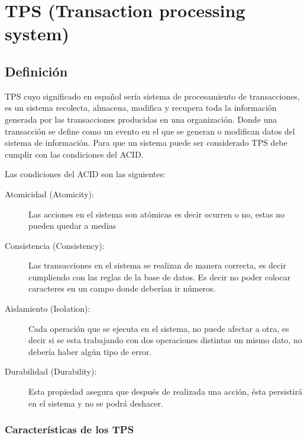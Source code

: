 \chapter[TPS]{TPS (Transaction processing system)}


\section {Definición}
TPS cuyo significado en español sería sistema de procesamiento de transacciones, es un sistema recolecta, almacena, modifica y recupera toda la información generada por las transacciones producidas en una organización.
Donde una transacción se define como un evento en el que se generan o modifican datos del sistema de información. Para que un sistema puede ser considerado TPS debe cumplir con las condiciones del ACID.


Las condiciones del ACID son las siguientes:
\begin {description}
\item [Atomicidad (Atomicity):] Las acciones en el sistema son atómicas es decir ocurren o no, estas no pueden quedar a medias

\item[Consistencia (Consistency):] Las transacciones en el sistema se realizan de manera correcta, es decir cumpliendo con las reglas de la base de datos. Es decir no poder colocar caracteres en un campo donde deberían ir números.

\item [Aislamiento (Isolation):] Cada operación que se ejecuta en el sistema, no puede afectar a otra, es decir si se esta trabajando con dos operaciones distintas un mismo dato, no debería haber algún tipo de error.

\item [Durabilidad (Durability):] Esta propiedad asegura que después de realizada una acción, ésta persistirá en el sistema y no se podrá deshacer.
\end {description}
\subsection {Características de los TPS}

